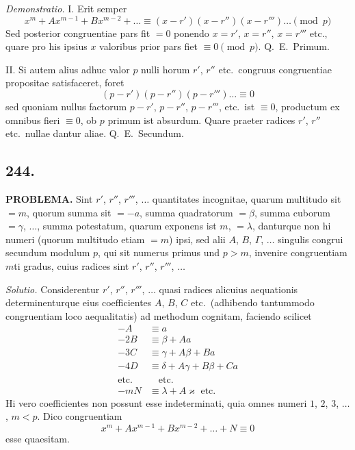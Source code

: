 \documentclass[12pt,a4paper]{article}
\begin{document}
\textit{Demonstratio.} I. Erit semper
\[
x^m+Ax^{m-1}+Bx^{m-2}+\ldots \equiv (x-r')(x-r'')(x-r''')\ldots \pmod{p}
\]
Sed posterior congruentiae pars fit $=0$ ponendo $x=r'$, $x=r''$, $x=r'''$ etc., quare pro his ipsius $x$ valoribus prior pars fiet $\equiv 0\pmod{p}$. Q.~E.~Primum.

II. Si autem alius adhuc valor $p$ nulli horum $r'$, $r''$ etc.~congruus congruentiae propositae satisfaceret, foret
\[
(p-r')(p-r'')(p-r''')\ldots \equiv 0
\]
sed quoniam nullus factorum $p-r'$, $p-r''$, $p-r'''$, etc.~ist $\equiv 0$, productum ex omnibus fieri $\equiv 0$, ob $p$ primum ist absurdum. Quare praeter radices $r'$, $r''$ etc.~nullae dantur aliae. Q.~E.~Secundum.

\subsection*{244.}

\textbf{PROBLEMA.} Sint $r'$, $r''$, $r'''$, $\ldots$ quantitates incognitae, quarum multitudo sit $=m$, quorum summa sit $=-a$, summa quadratorum $=\beta$, summa cuborum $=\gamma$, $\ldots$, summa potestatum, quarum exponens ist $m$, $=\lambda$, danturque non hi numeri (quorum multitudo etiam $=m$) ipsi, sed alii $A$, $B$, $\Gamma$, $\ldots$ singulis congrui secundum modulum $p$, qui sit numerus primus und $p>m$, invenire congruentiam $m$ti gradus, cuius radices sint $r'$, $r''$, $r'''$, $\ldots$

\textit{Solutio.} Considerentur $r'$, $r''$, $r'''$, $\ldots$ quasi radices alicuius aequationis determinenturque eius coefficientes $A$, $B$, $C$ etc.~(adhibendo tantummodo congruentiam loco aequalitatis) ad methodum cognitam, faciendo scilicet
\[
\begin{aligned}
-A &\equiv a\\
-2B &\equiv \beta + Aa\\
-3C &\equiv \gamma + A\beta + Ba\\
-4D &\equiv \delta + A\gamma + B\beta + Ca\\
\text{etc.} & \quad \text{etc.}\\
-mN &\equiv \lambda + A\varkappa \text{ etc.}
\end{aligned}
\]
Hi vero coefficientes non possunt esse indeterminati, quia omnes numeri $1$, $2$, $3$, $\ldots$, $m < p$. Dico congruentiam
\[
x^m + Ax^{m-1} + Bx^{m-2} + \ldots + N \equiv 0
\]
esse quaesitam.
\end{document}
